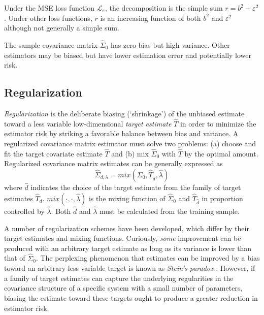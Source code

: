 Under the MSE loss function $\mathcal L_e$, the decomposition is the simple sum $r = b^2 + \varepsilon^2$. 
Under other loss functions, $r$ is an increasing function of both $b^2$ and $\varepsilon^2$ although not generally a simple sum.  

The sample covariance matrix $\hat\Sigma_0$ has zero bias but high variance. Other estimators may be biased but have lower estimation error and potentially lower risk.


\subsection{Regularization}

\emph{Regularization} is the deliberate biasing (`shrinkage') of the unbiased estimate toward a less variable low-dimensional \emph{target estimate} $\hat T$ in order to minimize the estimator risk by striking a favorable balance between bias and variance.
A regularized covariance matrix estimator must solve two problems: (a) choose and fit the target covariate estimate $\hat T$ and (b) mix $\hat\Sigma_0$ with $\hat T$ by the optimal amount. 
Regularized covariance matrix estimates can be generally expressed as 
\begin{equation}
\hat\Sigma_{d,\lambda} = mix(\Sigma_0,\hat T_{\hat d},\hat\lambda) 
\end{equation}
where $\hat d$ indicates the choice of the target estimate from the family of target estimates $\hat T_d$. $mix(\cdot,\cdot,\hat\lambda)$ is the mixing function of $\hat\Sigma_0$ and $\hat T_{\hat d}$ in proportion controlled by $\hat \lambda$. Both $\hat d$ and $\hat \lambda$ must be calculated from the training sample. 

A number of regularization schemes have been developed, which differ by their target estimates and mixing functions.    Curiously, \emph{some} improvement can be produced with an arbitrary target estimate as long as its variance is lower than that of $\hat\Sigma_0$.  The perplexing phenomenon that estimates can be improved by a bias toward an arbitrary less variable target is known as \emph{Stein's paradox} \citep{Efron:1977}.    However, if a family of target estimates can capture the underlying regularities in the covariance structure of a specific system with a small number of parameters, biasing the estimate toward these targets ought to produce a greater reduction in estimator risk. 

